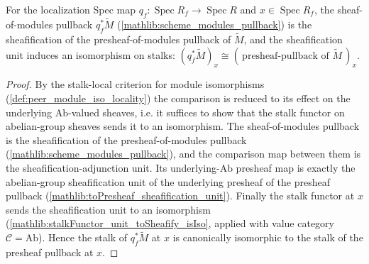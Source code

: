 
\begin{lemma}
  \label{lem:tilde_pullback_stalk_sheafificationStalk}
  \leanok
  For the localization Spec map \(q_f:\operatorname{Spec}R_f\to\operatorname{Spec}R\) and
  \(x\in\operatorname{Spec}R_f\), the sheaf-of-modules pullback \(q_f^{*}\widetilde M\)
  (\cref{mathlib:scheme_modules_pullback}) is the sheafification of the presheaf-of-modules
  pullback of \(\widetilde M\), and the sheafification unit induces an isomorphism on stalks:
  \((q_f^{*}\widetilde M)_x\cong(\,\text{presheaf-pullback of }\widetilde M\,)_x\).
\end{lemma}

\begin{proof}
  \leanok
  By the stalk-local criterion for module isomorphisms
  (\cref{def:peer_module_iso_locality}) the comparison is reduced to its effect on the
  underlying \(\mathrm{Ab}\)-valued sheaves, i.e. it suffices to show that the stalk functor
  on abelian-group sheaves sends it to an isomorphism.  The sheaf-of-modules
  pullback is the sheafification of the presheaf-of-modules pullback
  (\cref{mathlib:scheme_modules_pullback}), and the comparison map between them is the
  sheafification-adjunction unit.  Its underlying-\(\mathrm{Ab}\) presheaf map is exactly the
  abelian-group sheafification unit of the underlying presheaf of the
  presheaf pullback (\cref{mathlib:toPresheaf_sheafification_unit}).  Finally the stalk
  functor at \(x\) sends the sheafification unit to an isomorphism
  (\cref{mathlib:stalkFunctor_unit_toSheafify_isIso}, applied with value category
  \(\mathcal C=\mathrm{Ab}\)).  Hence the stalk of \(q_f^{*}\widetilde M\) at \(x\) is
  canonically isomorphic to the stalk of the presheaf pullback at \(x\).
\end{proof}


